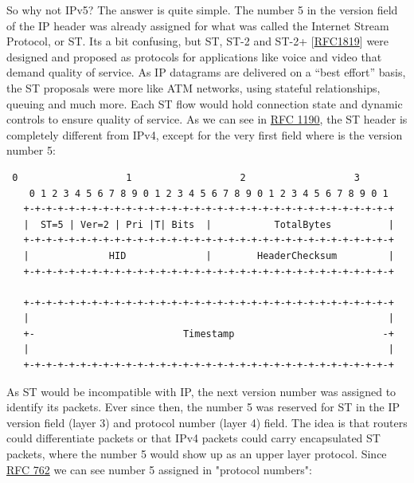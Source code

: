 \documentclass[
]{article}
\begin{document}
So why not IPv5? The answer is quite simple. The number 5 in the version
field of the IP header was already assigned for what was called the
Internet Stream Protocol, or ST. It\textquotesingle s a bit confusing,
but ST, ST-2 and ST-2+
{[}\href{https://www.rfc-editor.org/info/rfc1819}{RFC1819}{]} were
designed and proposed as protocols for applications like voice and video
that demand quality of service. As IP datagrams are delivered on a
``best effort'' basis, the ST proposals were more like ATM networks,
using stateful relationships, queuing and much more. Each ST flow would
hold connection state and dynamic controls to ensure quality of service.
As we can see in \href{https://www.rfc-editor.org/info/rfc1190}{RFC
1190}, the ST header is completely different from IPv4, except for the
very first field where is the version number 5:

\begin{verbatim}
 0                   1                   2                   3
    0 1 2 3 4 5 6 7 8 9 0 1 2 3 4 5 6 7 8 9 0 1 2 3 4 5 6 7 8 9 0 1
   +-+-+-+-+-+-+-+-+-+-+-+-+-+-+-+-+-+-+-+-+-+-+-+-+-+-+-+-+-+-+-+-+
   |  ST=5 | Ver=2 | Pri |T| Bits  |           TotalBytes          |
   +-+-+-+-+-+-+-+-+-+-+-+-+-+-+-+-+-+-+-+-+-+-+-+-+-+-+-+-+-+-+-+-+
   |              HID              |        HeaderChecksum         |
   +-+-+-+-+-+-+-+-+-+-+-+-+-+-+-+-+-+-+-+-+-+-+-+-+-+-+-+-+-+-+-+-+

   +-+-+-+-+-+-+-+-+-+-+-+-+-+-+-+-+-+-+-+-+-+-+-+-+-+-+-+-+-+-+-+-+
   |                                                               |
   +-                          Timestamp                          -+
   |                                                               |
   +-+-+-+-+-+-+-+-+-+-+-+-+-+-+-+-+-+-+-+-+-+-+-+-+-+-+-+-+-+-+-+-+
\end{verbatim}

As ST would be incompatible with IP, the next version number was
assigned to identify its packets. Ever since then, the number 5 was
reserved for ST in the IP version field (layer 3) and protocol number
(layer 4) field. The idea is that routers could differentiate packets or
that IPv4 packets could carry encapsulated ST packets, where the number
5 would show up as an upper layer protocol. Since
\href{https://www.rfc-editor.org/info/rfc762}{RFC 762} we can see number
5 assigned in "protocol numbers":
\end{document}
